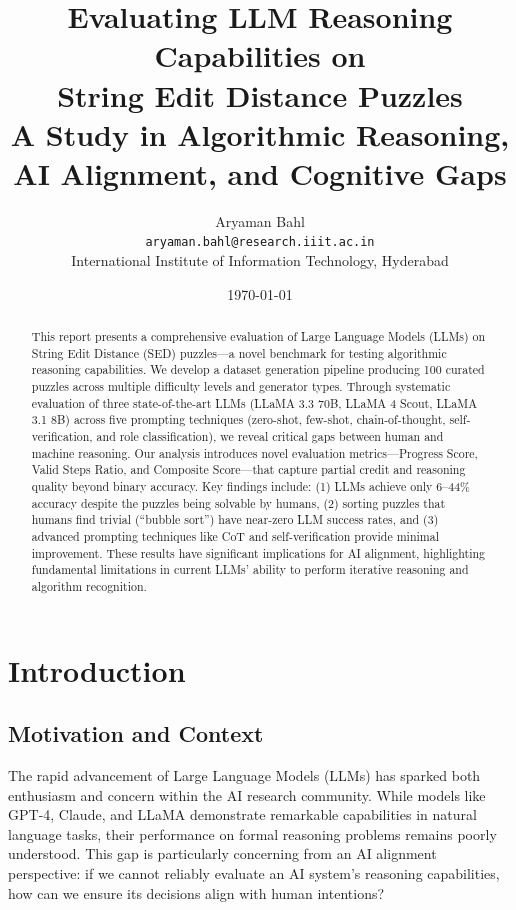 \documentclass[11pt,a4paper]{article}
\title{
    \vspace{-1cm}
    \Large{\textbf{Evaluating LLM Reasoning Capabilities on\\String Edit Distance Puzzles}}\\[0.5cm]
    \large{A Study in Algorithmic Reasoning, AI Alignment, and Cognitive Gaps}
}
\author{
    Aryaman Bahl\\
    \texttt{aryaman.bahl@research.iiit.ac.in}\\
    International Institute of Information Technology, Hyderabad
}
\date{\today}
\begin{document}
\maketitle

\begin{abstract}
This report presents a comprehensive evaluation of Large Language Models (LLMs) on String Edit Distance (SED) puzzles---a novel benchmark for testing algorithmic reasoning capabilities. We develop a dataset generation pipeline producing 100 curated puzzles across multiple difficulty levels and generator types. Through systematic evaluation of three state-of-the-art LLMs (LLaMA 3.3 70B, LLaMA 4 Scout, LLaMA 3.1 8B) across five prompting techniques (zero-shot, few-shot, chain-of-thought, self-verification, and role classification), we reveal critical gaps between human and machine reasoning. Our analysis introduces novel evaluation metrics---Progress Score, Valid Steps Ratio, and Composite Score---that capture partial credit and reasoning quality beyond binary accuracy. Key findings include: (1) LLMs achieve only 6--44\% accuracy despite the puzzles being solvable by humans, (2) sorting puzzles that humans find trivial (``bubble sort'') have near-zero LLM success rates, and (3) advanced prompting techniques like CoT and self-verification provide minimal improvement. These results have significant implications for AI alignment, highlighting fundamental limitations in current LLMs' ability to perform iterative reasoning and algorithm recognition.
\end{abstract}

\tableofcontents
\newpage

\section{Introduction}

\subsection{Motivation and Context}

The rapid advancement of Large Language Models (LLMs) has sparked both enthusiasm and concern within the AI research community. While models like GPT-4, Claude, and LLaMA demonstrate remarkable capabilities in natural language tasks, their performance on formal reasoning problems remains poorly understood. This gap is particularly concerning from an AI alignment perspective: if we cannot reliably evaluate an AI system's reasoning capabilities, how can we ensure its decisions align with human intentions?
\end{document}
